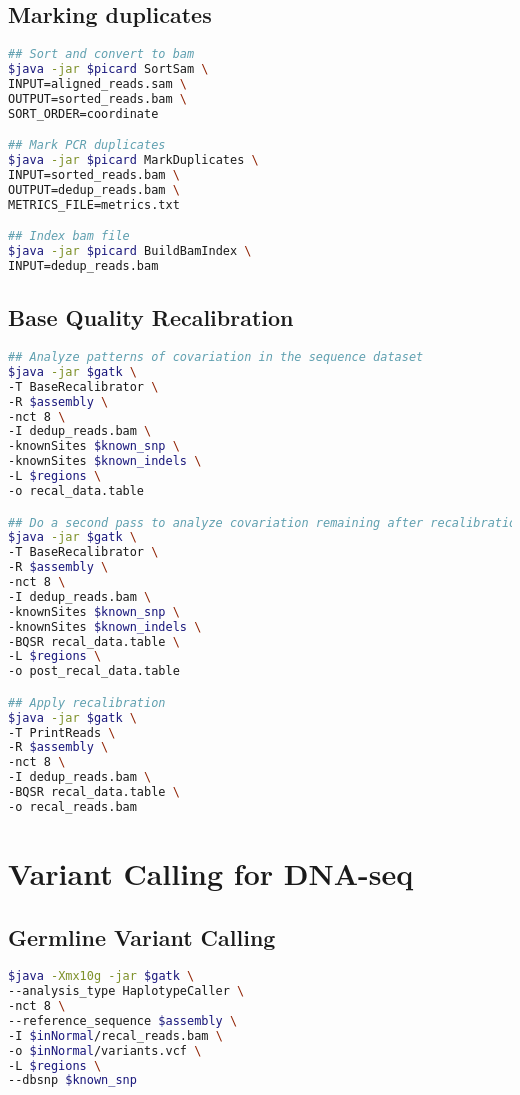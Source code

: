\documentclass[10pt, a4paper]{report}
\begin{document}
\section{Marking duplicates}
\begin{lstlisting}[language=bash]
## Sort and convert to bam
$java -jar $picard SortSam \
INPUT=aligned_reads.sam \
OUTPUT=sorted_reads.bam \
SORT_ORDER=coordinate

## Mark PCR duplicates
$java -jar $picard MarkDuplicates \
INPUT=sorted_reads.bam \
OUTPUT=dedup_reads.bam \
METRICS_FILE=metrics.txt

## Index bam file
$java -jar $picard BuildBamIndex \
INPUT=dedup_reads.bam
\end{lstlisting}

\section{Base Quality Recalibration}
\begin{lstlisting}[language=bash]
## Analyze patterns of covariation in the sequence dataset
$java -jar $gatk \
-T BaseRecalibrator \
-R $assembly \
-nct 8 \
-I dedup_reads.bam \
-knownSites $known_snp \
-knownSites $known_indels \
-L $regions \
-o recal_data.table

## Do a second pass to analyze covariation remaining after recalibration
$java -jar $gatk \
-T BaseRecalibrator \
-R $assembly \
-nct 8 \
-I dedup_reads.bam \
-knownSites $known_snp \
-knownSites $known_indels \
-BQSR recal_data.table \
-L $regions \
-o post_recal_data.table

## Apply recalibration
$java -jar $gatk \
-T PrintReads \
-R $assembly \
-nct 8 \
-I dedup_reads.bam \
-BQSR recal_data.table \
-o recal_reads.bam
\end{lstlisting}

\chapter{Variant Calling for DNA-seq}
\section{Germline Variant Calling}
\begin{lstlisting}[language=bash]
$java -Xmx10g -jar $gatk \
--analysis_type HaplotypeCaller \
-nct 8 \
--reference_sequence $assembly \
-I $inNormal/recal_reads.bam \
-o $inNormal/variants.vcf \
-L $regions \
--dbsnp $known_snp
\end{lstlisting}
\end{document}
